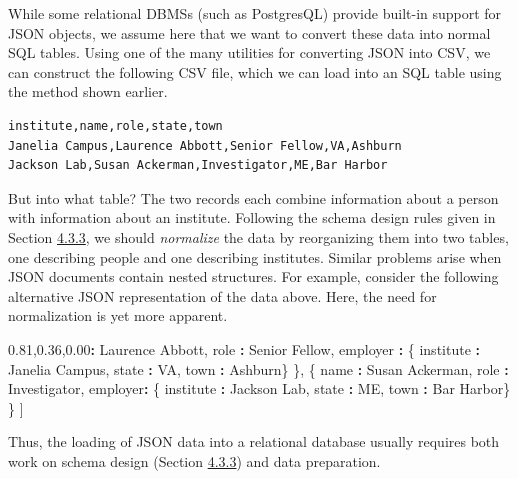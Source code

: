 \documentclass[]{krantz}
\newenvironment{Shaded}{\begin{snugshade}}{\end{snugshade}}
\newcommand{\StringTok}[1]{\textcolor[rgb]{0.31,0.60,0.02}{#1}}
\newcommand{\OperatorTok}[1]{\textcolor[rgb]{0.81,0.36,0.00}{\textbf{#1}}}
\newcommand{\NormalTok}[1]{#1}
\begin{document}
While some relational DBMSs (such as PostgresQL) provide built-in
support for JSON objects, we assume here that we want to convert these
data into normal SQL tables. Using one of the many utilities for
converting JSON into CSV, we can construct the following CSV file, which
we can load into an SQL table using the method shown earlier.

\begin{verbatim}
institute,name,role,state,town
Janelia Campus,Laurence Abbott,Senior Fellow,VA,Ashburn
Jackson Lab,Susan Ackerman,Investigator,ME,Bar Harbor
\end{verbatim}

But into what table? The two records each combine information about a
person with information about an institute. Following the schema design
rules given in Section \protect\hyperlink{sec:db:schema}{4.3.3}, we
should \emph{normalize} the data by reorganizing them into two tables,
one describing people and one describing institutes. Similar problems
arise when JSON documents contain nested structures. For example,
consider the following alternative JSON representation of the data
above. Here, the need for normalization is yet more apparent.

\begin{Shaded}
\begin{Highlighting}[]
\NormalTok{[}
\NormalTok{  \{}
\NormalTok{    name }\OperatorTok{:}\StringTok{ }\NormalTok{Laurence Abbott,}
\NormalTok{    role }\OperatorTok{:}\StringTok{ }\NormalTok{Senior Fellow,}
\NormalTok{    employer }\OperatorTok{:}\StringTok{ }\NormalTok{\{ institute }\OperatorTok{:}\StringTok{ }\NormalTok{Janelia Campus,}
\NormalTok{                 state }\OperatorTok{:}\StringTok{ }\NormalTok{VA,}
\NormalTok{                 town }\OperatorTok{:}\StringTok{ }\NormalTok{Ashburn\}}
\NormalTok{  \},}
\NormalTok{  \{}
\NormalTok{    name }\OperatorTok{:}\StringTok{ }\NormalTok{Susan Ackerman,}
\NormalTok{    role }\OperatorTok{:}\StringTok{ }\NormalTok{Investigator,}
\NormalTok{    employer}\OperatorTok{:}\StringTok{ }\NormalTok{\{ institute }\OperatorTok{:}\StringTok{ }\NormalTok{Jackson Lab,}
\NormalTok{                state }\OperatorTok{:}\StringTok{ }\NormalTok{ME,}
\NormalTok{                town }\OperatorTok{:}\StringTok{ }\NormalTok{Bar Harbor\}}
\NormalTok{  \}}
\NormalTok{]}
\end{Highlighting}
\end{Shaded}

Thus, the loading of JSON data into a relational database usually
requires both work on schema design (Section
\protect\hyperlink{sec:db:schema}{4.3.3}) and data preparation.
\end{document}

